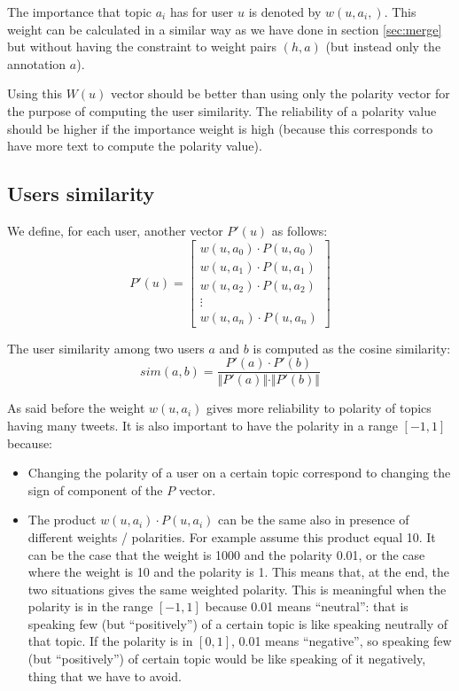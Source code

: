 \documentclass[a4paper,11pt,oneside]{article}
\begin{document}
The importance that topic $a_i$ has for user $u$ is denoted by $w(u,a_i,)$. This weight can be calculated in a similar way as we have done in section \ref{sec:merge} but without having the constraint to weight pairs $(h,a)$ (but instead only the annotation $a$).

Using this $W(u)$ vector should be better than using only the polarity vector for the purpose of computing the user similarity. The reliability of a polarity value should be higher if the importance weight is high (because this corresponds to have more text to compute the polarity value).

\subsection{Users similarity}
We define, for each user, another vector $P'(u)$ as follows:
\begin{equation}
P'(u) = \left[  \begin{array}{c}
w(u,a_0) \cdot P(u,a_0) \\ 
w(u,a_1)  \cdot P(u,a_1) \\ 
w(u,a_2)  \cdot P(u,a_2) \\ 
\vdots \\ 
w(u,a_n) \cdot P(u,a_n)
\end{array}\right]
\end{equation}

The user similarity among two users $a$ and $b$ is computed as the cosine similarity:
\begin{equation}
sim(a,b) = \frac{P'(a) \cdot P'(b)}{\Vert P'(a)\Vert \cdot \Vert P'(b) \Vert} 
\end{equation}

As said before the weight $w(u,a_i)$ gives more reliability to polarity of topics having many tweets. It is also important to have the polarity in a range $[-1,1]$ because:

\begin{itemize}
\item Changing the polarity of a user on a certain topic correspond to changing the sign of component of the $P$ vector.
\item The product $w(u,a_i) \cdot P(u,a_i)$ can be the same also in presence of different weights / polarities. For example assume this product equal 10. It can be the case that the weight is 1000 and the polarity 0.01, or the case where the weight is 10 and the polarity is 1.
This means that, at the end, the two situations gives the same weighted polarity. This is meaningful when the polarity is in the range $[-1,1]$ because 0.01 means ``neutral'': that is speaking few (but ``positively'') of a certain topic is like speaking neutrally of that topic.
If the polarity is in $[0,1]$, 0.01 means ``negative'', so speaking few (but ``positively'') of certain topic would be like speaking of it negatively, thing that we have to avoid.
\end{itemize}



\end{document}
